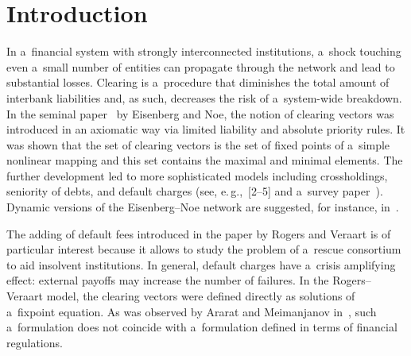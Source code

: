 




      \thispagestyle{myheadings}

      \begin{multicols}{2}

                  \label{st\stat}
                
    
\section{Introduction}

\noindent
In a~financial system with strongly interconnected institutions, a~shock touching even 
a~small number of entities can propagate through the network and lead to substantial losses. 
Clearing is a~procedure that diminishes the total amount of interbank liabilities and, as such, decreases the risk of 
a~system-wide breakdown. In the seminal paper~\cite{eisenberg2001systemic} by Eisenberg and Noe, the  notion of clearing vectors
 was introduced in an axiomatic way   via  limited liability and absolute priority rules.  
 It was shown that the set of clearing vectors is the set of fixed points of 
 a~simple nonlinear mapping and this set contains the maximal and minimal  elements. 
 The further development led to more sophisticated models including crossholdings, seniority of debts, and default charges (see, 
 e.\,g.,~[2--5] %
 and a~survey paper~\cite{kabanov2018clearing}). 
 Dynamic versions of the Eisenberg--Noe network are suggested, for instance, in~\cite{feinstein2019dynamic, djete2021mean}. 

The adding of default fees introduced in the paper by Rogers and Veraart \cite{RV2013} is of particular interest 
because it allows to study the problem of a~rescue consortium to aid  insolvent institutions. 
In general, default charges have a~crisis amplifying effect: external payoffs may increase the number 
of  failures. 
In the Rogers--Veraart model, the clearing vectors were defined directly as solutions of a~fixpoint equation.  
As was observed by Ararat and Meimanjanov in~\cite{Ararat2019}, such a~formulation does not coincide with a~formulation defined in terms  of financial regulations. 



\end{multicols}
